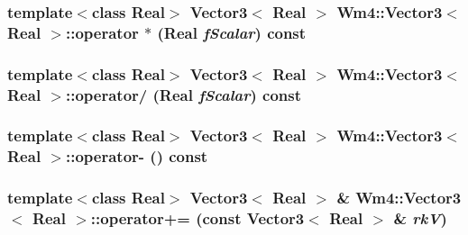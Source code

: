 \subsubsection{\setlength{\rightskip}{0pt plus 5cm}template$<$class Real$>$ {\bf Vector3}$<$ Real $>$ {\bf Wm4::Vector3}$<$ Real $>$::operator $\ast$ (Real {\em f\-Scalar}) const\hspace{0.3cm}{\tt  [inline]}}\label{classWm4_1_1Vector3_8daebcb3f93401a705b1fa0e00591fd2}


\subsubsection{\setlength{\rightskip}{0pt plus 5cm}template$<$class Real$>$ {\bf Vector3}$<$ Real $>$ {\bf Wm4::Vector3}$<$ Real $>$::operator/ (Real {\em f\-Scalar}) const\hspace{0.3cm}{\tt  [inline]}}\label{classWm4_1_1Vector3_6ad5c9c95d41fca84ef29b56367a4dd7}


\subsubsection{\setlength{\rightskip}{0pt plus 5cm}template$<$class Real$>$ {\bf Vector3}$<$ Real $>$ {\bf Wm4::Vector3}$<$ Real $>$::operator- () const\hspace{0.3cm}{\tt  [inline]}}\label{classWm4_1_1Vector3_7e96a2252e4e8feec613ff6c11630f23}


\subsubsection{\setlength{\rightskip}{0pt plus 5cm}template$<$class Real$>$ {\bf Vector3}$<$ Real $>$ \& {\bf Wm4::Vector3}$<$ Real $>$::operator+= (const {\bf Vector3}$<$ Real $>$ \& {\em rk\-V})\hspace{0.3cm}{\tt  [inline]}}\label{classWm4_1_1Vector3_2b60ed421e03409beca697cfefe775a0}


